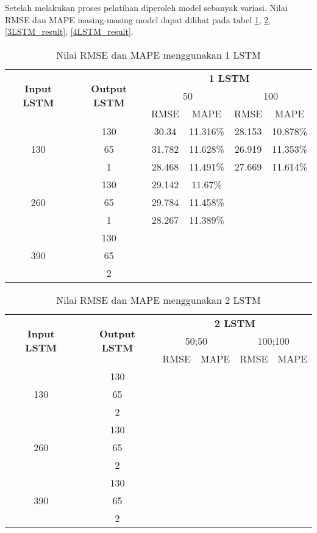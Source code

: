 \documentclass[../thesis.tex]{subfiles}
\begin{document}
Setelah melakukan proses pelatihan diperoleh model sebanyak variasi. Nilai RMSE dan MAPE masing-masing model dapat dilihat pada tabel \ref{1LSTM_result}, \ref{2LSTM_result},\ref{3LSTM_result}, \ref{4LSTM_result}.
\begin{table}[htp]
\centering
\begin{tabular}{|c|c|c|c|c|c|}
	\hline 
	\multirow{3}{*}{\textbf{Input LSTM}} & \multirow{3}{*}{\textbf{Output LSTM}} & \multicolumn{4}{c|}{\textbf{1 LSTM}} \\ \cline{3-6}
	&  & \multicolumn{2}{c|}{50}& \multicolumn{2}{c|}{100} \\ \cline{3-6}
	& & RMSE & MAPE& RMSE & MAPE\\
	\hline
	\multirow{3}{*}{130} & 130 & 30.34& 11.316\%& 28.153 & 10.878\%\\
	& 65 & 31.782 & 11.628\% & 26.919 & 11.353\% \\
	& 1 & 28.468 & 11.491\% & 27.669 & 11.614\% \\
	\hline
	\multirow{3}{*}{260} & 130 & 29.142 & 11.67\%  & & \\
	& 65 & 29.784 & 11.458\% & & \\
	& 1 & 28.267 & 11.389\% & & \\
	\hline
	\multirow{3}{*}{390} & 130 & & & & \\
	& 65 & & & & \\
	& 2 & & & & \\
	\hline
\end{tabular}
\caption{Nilai RMSE dan MAPE menggunakan 1 LSTM}
\label{1LSTM_result}
\end{table} 

\begin{table}[htp]
	\centering
	\begin{tabular}{|c|c|c|c|c|c|}
		\hline 
		\multirow{3}{*}{\textbf{Input LSTM}} & \multirow{3}{*}{\textbf{Output LSTM}} & \multicolumn{4}{c|}{\textbf{2 LSTM}} \\ \cline{3-6}
		&  & \multicolumn{2}{c|}{50;50}& \multicolumn{2}{c|}{100;100} \\ \cline{3-6}
		& & RMSE & MAPE& RMSE & MAPE\\
		\hline
		\multirow{3}{*}{130} & 130 & & & & \\
		& 65 & & & & \\
		& 2 & & & & \\
		\hline
		\multirow{3}{*}{260} & 130 & & & & \\
		& 65 & & & & \\
		& 2 & & & & \\
		\hline
		\multirow{3}{*}{390} & 130 & & & & \\
		& 65 & & & & \\
		& 2 & & & & \\
		\hline
	\end{tabular}
	\caption{Nilai RMSE dan MAPE menggunakan 2 LSTM}
	\label{2LSTM_result}
	\end{table} 
\end{document}
